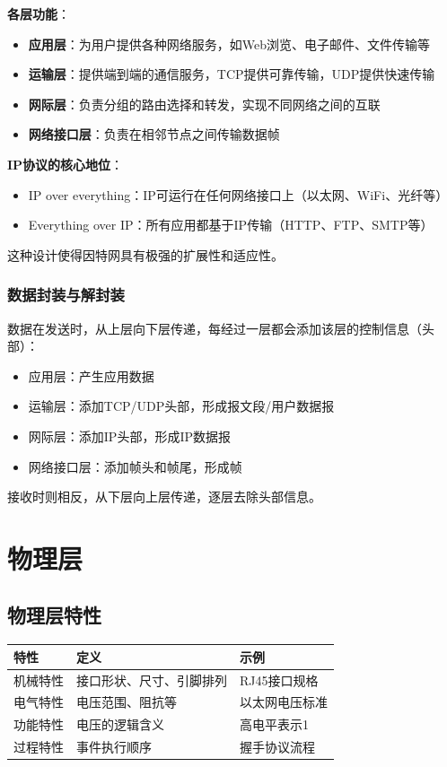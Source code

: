 \documentclass[12pt,a4paper,openany]{ctexbook}
\begin{document}
\textbf{各层功能}：
\begin{itemize}[leftmargin=2em,itemsep=0pt]
    \item \textbf{应用层}：为用户提供各种网络服务，如Web浏览、电子邮件、文件传输等
    \item \textbf{运输层}：提供端到端的通信服务，TCP提供可靠传输，UDP提供快速传输
    \item \textbf{网际层}：负责分组的路由选择和转发，实现不同网络之间的互联
    \item \textbf{网络接口层}：负责在相邻节点之间传输数据帧
\end{itemize}

\begin{notebox}
\textbf{IP协议的核心地位}：
\begin{itemize}[itemsep=0pt]
    \item IP over everything：IP可运行在任何网络接口上（以太网、WiFi、光纤等）
    \item Everything over IP：所有应用都基于IP传输（HTTP、FTP、SMTP等）
\end{itemize}
这种设计使得因特网具有极强的扩展性和适应性。
\end{notebox}

\subsection{数据封装与解封装}
数据在发送时，从上层向下层传递，每经过一层都会添加该层的控制信息（头部）：
\begin{itemize}[leftmargin=2em,itemsep=0pt]
    \item 应用层：产生应用数据
    \item 运输层：添加TCP/UDP头部，形成报文段/用户数据报
    \item 网际层：添加IP头部，形成IP数据报
    \item 网络接口层：添加帧头和帧尾，形成帧
\end{itemize}

接收时则相反，从下层向上层传递，逐层去除头部信息。


\chapter{物理层}
\section{物理层特性}
\begin{table}[htbp]
\centering\small
\begin{tabular}{lll}
\toprule
\textbf{特性} & \textbf{定义} & \textbf{示例} \\
\midrule
机械特性 & 接口形状、尺寸、引脚排列 & RJ45接口规格 \\
电气特性 & 电压范围、阻抗等 & 以太网电压标准 \\
功能特性 & 电压的逻辑含义 & 高电平表示1 \\
过程特性 & 事件执行顺序 & 握手协议流程 \\
\bottomrule
\end{tabular}
\end{table}
\end{document}
